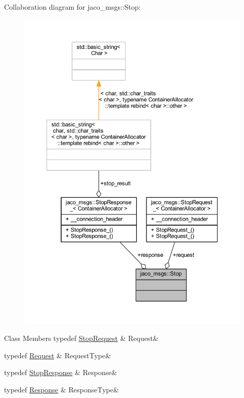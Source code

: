 Collaboration diagram for jaco\+\_\+msgs\+:\+:Stop\+:
\nopagebreak
\begin{figure}[H]
\begin{center}
\leavevmode
\includegraphics[width=350pt]{da/d03/structjaco__msgs_1_1Stop__coll__graph}
\end{center}
\end{figure}
\begin{DoxyFields}{Class Members}
typedef \hyperlink{namespacejaco__msgs_a7f71a39d70d57c48cf1d0e67cb41d127}{Stop\+Request}\hypertarget{namespacejaco__msgs_a5c2942c9b9b1fe5330e2b79bfaef2847}{}\label{namespacejaco__msgs_a5c2942c9b9b1fe5330e2b79bfaef2847}
&
Request&
\\
\hline

typedef \hyperlink{namespacejaco__msgs_a5c2942c9b9b1fe5330e2b79bfaef2847}{Request}\hypertarget{namespacejaco__msgs_ae68e41bf3bbdaca9284bb07f757267e8}{}\label{namespacejaco__msgs_ae68e41bf3bbdaca9284bb07f757267e8}
&
Request\+Type&
\\
\hline

typedef \hyperlink{namespacejaco__msgs_a2694506badd782d8dc5474717333e374}{Stop\+Response}\hypertarget{namespacejaco__msgs_aad03f8a7d16be1d6f6a0c1b2faf9cef2}{}\label{namespacejaco__msgs_aad03f8a7d16be1d6f6a0c1b2faf9cef2}
&
Response&
\\
\hline

typedef \hyperlink{namespacejaco__msgs_aad03f8a7d16be1d6f6a0c1b2faf9cef2}{Response}\hypertarget{namespacejaco__msgs_a9a83d4f1b663627f00fc8da36fe18139}{}\label{namespacejaco__msgs_a9a83d4f1b663627f00fc8da36fe18139}
&
Response\+Type&
\\
\hline

\end{DoxyFields}
